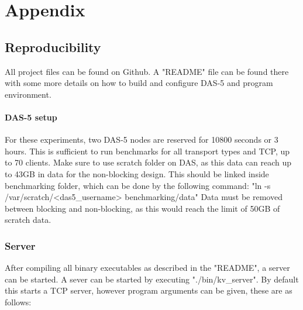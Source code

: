 
\chapter{Appendix} %



\ifpdf
    \graphicspath{{X/figures/PNG/}{X/figures/PDF/}{X/figures/}}
\else
    \graphicspath{{X/figures/EPS/}{X/figures/}}
\fi

%
%

\section{Reproducibility}
All project files can be found on Github\cite{github}.
A "README" file can be found there with some more details on how to build and configure DAS-5 and program environment.

\subsubsection{DAS-5 setup}
For these experiments, two DAS-5 nodes are reserved for 10800 seconds or 3 hours.
This is sufficient to run benchmarks for all transport types and TCP, up to 70 clients.
Make sure to use scratch folder on DAS, as this data can reach up to 43GB in data for the non-blocking design.
This should be linked inside benchmarking folder, which can be done by the following command: "ln -s /var/scratch/<das5\_username> benchmarking/data"
Data must be removed between blocking and non-blocking, as this would reach the limit of 50GB of scratch data.

\subsection{Server}
After compiling all binary executables as described in the "README", a server can be started.
A sever can be started by executing "./bin/kv\_server".
By default this starts a TCP server, however program arguments can be given, these are as follows:


